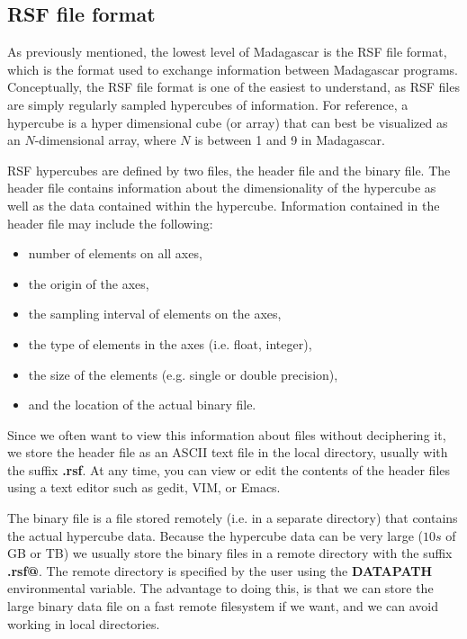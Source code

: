 \subsection{RSF file format}

As previously mentioned, the lowest level of Madagascar is the RSF file format, which is the format used to exchange information between Madagascar programs.  Conceptually, the RSF file format is one of the easiest to understand, as RSF files are simply regularly sampled hypercubes of information.   For reference, a hypercube is a hyper dimensional cube (or array) that can best be visualized as an $N$-dimensional array, where $N$ is between 1 and 9 in Madagascar. 

RSF hypercubes are defined by two files, the header file and the binary file.  The header file contains information about the dimensionality of the hypercube as well as the data contained within the hypercube.  Information contained in the header file may include the following: 
\begin{itemize}
    \item number of elements on all axes,
    \item the origin of the axes,
    \item the sampling interval of elements on the axes,
    \item the type of elements in the axes (i.e. float, integer),
    \item the size of the elements (e.g. single or double precision),
    \item and the location of the actual binary file.
\end{itemize}
Since we often want to view this information about files without deciphering it, we store the header file as an ASCII text file in the local directory, usually with the suffix \textbf{.rsf}.  At any time, you can view or edit the contents of the header files using a text editor such as gedit, VIM, or Emacs.

The binary file is a file stored remotely (i.e. in a separate directory) that contains the actual hypercube data.  Because the hypercube data can be very large ($10s$ of GB or TB) we usually store the binary files in a remote directory with the suffix \textbf{.rsf@}.  The remote directory is specified by the user using the \textbf{DATAPATH} environmental variable.  The advantage to doing this, is that we can store the large binary data file on a fast remote filesystem if we want, and we can avoid working in local directories.  

